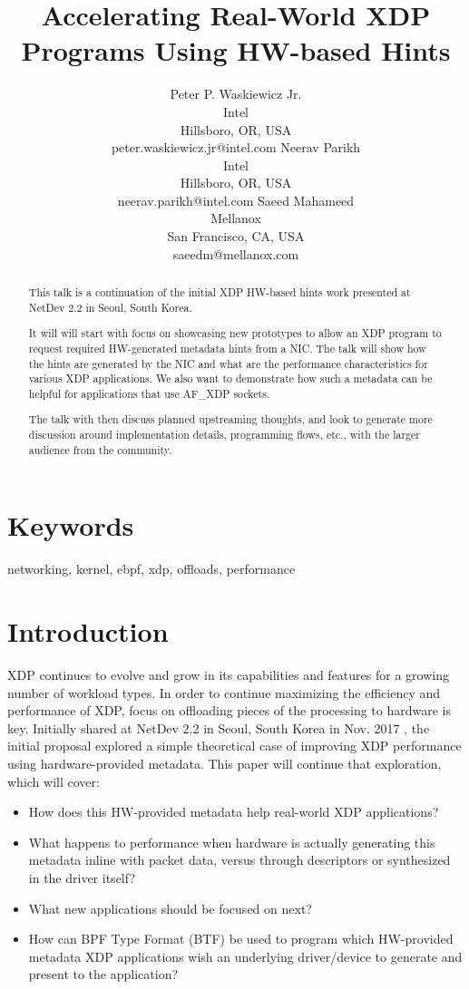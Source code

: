 \documentclass[letterpaper]{article}
\title{Accelerating Real-World XDP Programs Using HW-based Hints}
\author{Peter P. Waskiewicz Jr. \\ Intel \\ Hillsboro, OR, USA \\ peter.waskiewicz.jr@intel.com
\And Neerav Parikh \\ Intel \\ Hillsboro, OR, USA \\ neerav.parikh@intel.com
\And Saeed Mahameed \\ Mellanox \\ San Francisco, CA, USA \\ saeedm@mellanox.com
\newline
\newline
}
\begin{document}
 
\maketitle
\begin{abstract}
This talk is a continuation of the initial XDP HW-based hints work presented at NetDev 2.2 in Seoul, South Korea.

It will will start with focus on showcasing new prototypes to allow an XDP program to request required HW-generated metadata hints from a NIC. The talk will show how the hints are generated by the NIC and what are the performance characteristics for various XDP applications. We also want to demonstrate how such a metadata can be helpful for applications that use AF\_XDP sockets.

The talk with then discuss planned upstreaming thoughts, and look to generate more discussion around implementation details, programming flows, etc., with the larger audience from the community.
\end{abstract}

\section{Keywords}

networking, kernel, ebpf, xdp, offloads, performance

\section{Introduction}
XDP continues to evolve and grow in its capabilities and features for a growing number of workload types.  In order to continue maximizing the efficiency and performance of XDP, focus on offloading pieces of the processing to hardware is key.  Initially shared at NetDev 2.2 in Seoul, South Korea in Nov. 2017 \cite{xdp-acceleration-2017}, the initial proposal explored a simple theoretical case of improving XDP performance using hardware-provided metadata.  This paper will continue that exploration, which will cover:
\begin{itemize}
\item How does this HW-provided metadata help real-world XDP applications?
\item What happens to performance when hardware is actually generating this metadata inline with packet data, versus through descriptors or synthesized in the driver itself?
\item What new applications should be focused on next?
\item How can BPF Type Format (BTF) be used to program which HW-provided metadata XDP applications wish an underlying driver/device to generate and present to the application?
\end{itemize}
\end{document}
